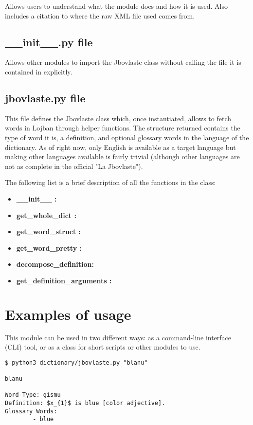 Allows users to understand what the module does and how it is used.
Also includes a citation to where the raw XML file used comes from.

\subsection*{\_\_init\_\_.py file}

Allows other modules to import the Jbovlaste class without calling the file it is contained in explicitly.

\subsection*{jbovlaste.py file}

This file defines the Jbovlaste class which, once instantiated, allows to fetch
words in Lojban through helper functions. The structure returned contains the type of word it is,
a definition, and optional glossary words in the language of the dictionary.
As of right now, only English is available as a target language but making other
languages available is fairly trivial (although other languages are not as complete
in the official "La Jbovlaste").\newline

\newpage

The following list is a brief description of all the
functions in the class:

\begin{itemize}
\item \textbf{\_\_init\_\_ :}
\item \textbf{get\_whole\_dict :}
\item \textbf{get\_word\_struct :}
\item \textbf{get\_word\_pretty :}
\item \textbf{decompose\_definition:}
\item \textbf{get\_definition\_arguments :}
\end{itemize}

\newpage

\section{Examples of usage}

This module can be used in two different ways: as a command-line interface (CLI) tool, or as a class for short scripts or other modules to use.

\begin{lstlisting}[caption=Jbovlaste module being used as a command-line interface tool]
$ python3 dictionary/jbovlaste.py "blanu"

blanu

Word Type: gismu
Definition: $x_{1}$ is blue [color adjective].
Glossary Words:
        - blue
\end{lstlisting}


